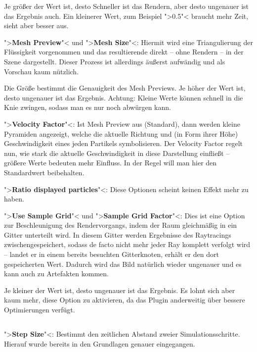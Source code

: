 \documentclass[10pt,DIV=14,a4paper]{scrartcl}
\begin{document}
	Je größer der Wert ist, desto Schneller ist das Rendern, aber desto
	ungenauer ist das Ergebnis auch. Ein kleinerer Wert, zum Beispiel
	">0.5"< braucht mehr Zeit, sieht aber besser aus.

	\item ">\textbf{Mesh Preview}"< und ">\textbf{Mesh Size}"<: Hiermit
	wird eine Triangulierung der Flüssigkeit vorgenommen und das
	resultierende \TriMesh direkt -- ohne Rendern -- in der Szene
	dargestellt. Dieser Prozess ist allerdings äußerst aufwändig und als
	Vorschau kaum nützlich.

	Die Größe bestimmt die Genauigkeit des Mesh Previews. Je höher der
	Wert ist, desto ungenauer ist das Ergebnis. Achtung: Kleine Werte
	können \aoi schnell in die Knie zwingen, sodass man es nur noch
	abwürgen kann.

	\item ">\textbf{Velocity Factor}"<: Ist Mesh Preview aus (Standard),
	dann werden kleine Pyramiden angezeigt, welche die aktuelle Richtung
	und (in Form ihrer Höhe) Geschwindigkeit eines jeden Partikels
	symbolisieren. Der Velocity Factor regelt nun, wie stark die
	aktuelle Geschwindigkeit in diese Darstellung einfließt -- größere
	Werte bedeuten mehr Einfluss. In der Regel will man hier den
	Standardwert beibehalten.

	\item ">\textbf{Ratio displayed particles}"<: Diese Optionen scheint
	keinen Effekt mehr zu haben.

	\item ">\textbf{Use Sample Grid}"< und ">\textbf{Sample Grid
	Factor}"<: Dies ist eine Option zur Beschleunigung des
	Rendervorgangs, indem der Raum gleichmäßig in ein Gitter unterteilt
	wird. In diesem Gitter werden Ergebnisse des Raytracings
	zwischengespeichert, sodass de facto nicht mehr jeder Ray komplett
	verfolgt wird -- landet er in einem bereits besuchten Gitterknoten,
	erhält er den dort gespeicherten Wert. Dadurch wird das Bild
	natürlich wieder ungenauer und es kann auch zu Artefakten kommen.

	Je kleiner der Wert ist, desto ungenauer ist das Ergebnis. Es lohnt
	sich aber kaum mehr, diese Option zu aktivieren, da das Plugin
	anderweitig über bessere Optimierungen verfügt.

\itE

\subsection{}
\itA
	\item ">\textbf{Step Size}"<: Bestimmt den zeitlichen Abstand zweier
	Simulationsschritte. Hierauf wurde bereits in den Grundlagen genauer
	eingegangen.
\end{document}
